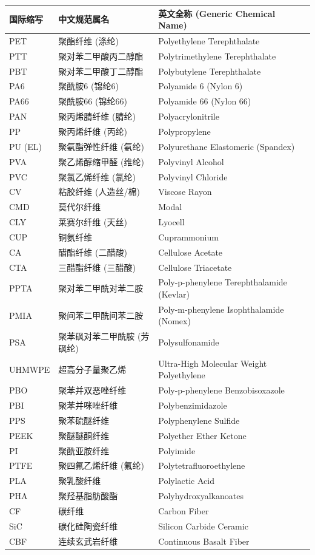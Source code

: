 \documentclass[11pt,openright,twoside,UTF8]{ctexbook}
\begin{document}
\begin{center}
\small
\begin{longtable}{p{2.5cm}p{4.5cm}p{6.5cm}}
\toprule
\textbf{国际缩写} & \textbf{中文规范属名} & \textbf{英文全称 (Generic Chemical Name)} \\
\midrule
\endhead
PET & 聚酯纤维 (涤纶) & Polyethylene Terephthalate \\
PTT & 聚对苯二甲酸丙二醇酯 & Polytrimethylene Terephthalate \\
PBT & 聚对苯二甲酸丁二醇酯 & Polybutylene Terephthalate \\
PA6 & 聚酰胺6 (锦纶6) & Polyamide 6 (Nylon 6) \\
PA66 & 聚酰胺66 (锦纶66) & Polyamide 66 (Nylon 66) \\
PAN & 聚丙烯腈纤维 (腈纶) & Polyacrylonitrile \\
PP & 聚丙烯纤维 (丙纶) & Polypropylene \\
PU (EL) & 聚氨酯弹性纤维 (氨纶) & Polyurethane Elastomeric (Spandex) \\
PVA & 聚乙烯醇缩甲醛 (维纶) & Polyvinyl Alcohol \\
PVC & 聚氯乙烯纤维 (氯纶) & Polyvinyl Chloride \\
CV & 粘胶纤维 (人造丝/棉) & Viscose Rayon \\
CMD & 莫代尔纤维 & Modal \\
CLY & 莱赛尔纤维 (天丝) & Lyocell \\
CUP & 铜氨纤维 & Cuprammonium \\
CA & 醋酯纤维 (二醋酸) & Cellulose Acetate \\
CTA & 三醋酯纤维 (三醋酸) & Cellulose Triacetate \\
PPTA & 聚对苯二甲酰对苯二胺 & Poly-p-phenylene Terephthalamide (Kevlar) \\
PMIA & 聚间苯二甲酰间苯二胺 & Poly-m-phenylene Isophthalamide (Nomex) \\
PSA & 聚苯砜对苯二甲酰胺 (芳砜纶) & Polysulfonamide \\
UHMWPE & 超高分子量聚乙烯 & Ultra-High Molecular Weight Polyethylene \\
PBO & 聚苯并双恶唑纤维 & Poly-p-phenylene Benzobisoxazole \\
PBI & 聚苯并咪唑纤维 & Polybenzimidazole \\
PPS & 聚苯硫醚纤维 & Polyphenylene Sulfide \\
PEEK & 聚醚醚酮纤维 & Polyether Ether Ketone \\
PI & 聚酰亚胺纤维 & Polyimide \\
PTFE & 聚四氟乙烯纤维 (氟纶) & Polytetrafluoroethylene \\
PLA & 聚乳酸纤维 & Polylactic Acid \\
PHA & 聚羟基脂肪酸酯 & Polyhydroxyalkanoates \\
CF & 碳纤维 & Carbon Fiber \\
SiC & 碳化硅陶瓷纤维 & Silicon Carbide Ceramic \\
CBF & 连续玄武岩纤维 & Continuous Basalt Fiber \\
\bottomrule
\end{longtable}
\end{center}
\end{document}
